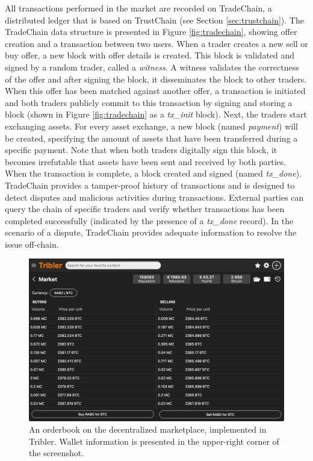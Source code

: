 \documentclass[USenglish]{article}
\begin{document}
All transactions performed in the market are recorded on TradeChain, a distributed ledger that is based on TrustChain (see Section \ref{sec:trustchain}).
The TradeChain data structure is presented in Figure \ref{fig:tradechain}, showing offer creation and a transaction between two users.
When a trader creates a new sell or buy offer, a new block with offer details is created.
This block is validated and signed by a random trader, called a \emph{witness}.
A witness validates the correctness of the offer and after signing the block, it disseminates the block to other traders.
When this offer has been matched against another offer, a transaction is initiated and both traders publicly commit to this transaction by signing and storing a block (shown in Figure \ref{fig:tradechain} as a \emph{tx\_init} block).
Next, the traders start exchanging assets.
For every asset exchange, a new block (named \emph{payment}) will be created, specifying the amount of assets that have been transferred during a specific payment.
Note that when both traders digitally sign this block, it becomes irrefutable that assets have been sent and received by both parties.
When the transaction is complete, a block created and signed (named \emph{tx\_done}).
TradeChain provides a tamper-proof history of transactions and is designed to detect disputes and malicious activities during transactions.
External parties can query the chain of specific traders and verify whether transactions has been completed successfully (indicated by the presence of a \emph{tx\_done} record).
In the scenario of a dispute, TradeChain provides adequate information to resolve the issue off-chain.

\begin{figure}[t]
	\centering
	\includegraphics[width=.9\columnwidth]{assets/tribler_market}
	\caption{An orderbook on the decentralized marketplace, implemented in Tribler. Wallet information is presented in the upper-right corner of the screenshot.}
	\label{fig:tribler_market}
\end{figure}
\end{document}

